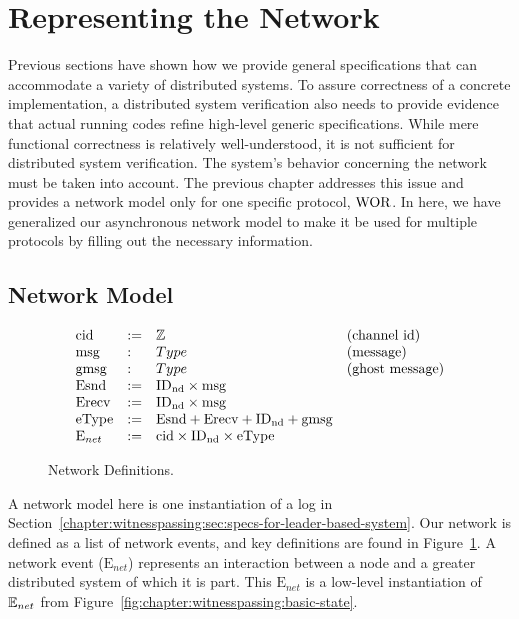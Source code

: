 \section{Representing the Network}
\label{chapter:witnesspassing:sec:low-level-implementation}


Previous sections have shown how we provide general specifications
that can accommodate a variety of distributed systems.  To assure correctness of a concrete implementation, a distributed system verification also needs to
provide evidence that actual running codes refine high-level generic
specifications. While mere functional correctness is relatively well-understood,
it is not sufficient for distributed system verification. The
system's behavior concerning the network must be taken into account. 
The previous chapter addresses this issue and provides a network model only for one specific protocol, $\mathrm{WOR}$. 
In here, we have generalized our asynchronous network model to make it be used for multiple protocols by filling out the necessary information. 




\subsection{Network Model}
\label{chapter:witnesspassing:subsec:network-model}

\begin{figure}
\begin{small}
\raggedright
$$
\begin{array}{llll}
\mathrm{cid} & := & \mathbb{Z} & \mbox{(channel id)} \\
\mathrm{msg} & : & Type & \mbox{(message)} \\
\mathrm{gmsg} & : & Type & \mbox{(ghost message)} \\
\mathrm{Esnd} & := & \mathrm{ID_{nd}} \times \mathrm{msg} \\
\mathrm{Erecv} & := & \mathrm{ID_{nd}} \times \mathrm{msg} \\
\mathrm{eType} & := & \mathrm{Esnd} + \mathrm{Erecv} + \mathrm{ID_{nd}} + \mathrm{gmsg} \\
\mathrm{E}_{net} & := & \mathrm{cid} \times \mathrm{ID_{nd}} \times \mathrm{eType} \\
\end{array}
$$
\end{small}
\caption{Network Definitions.}
\label{fig:chapter:witnesspassing:net-defs}
\end{figure}


A network model here is one instantiation of a log in
 Section~\ref{chapter:witnesspassing:sec:specs-for-leader-based-system}. Our network is defined as a list of
network events, and key definitions are found in Figure~\ref{fig:chapter:witnesspassing:net-defs}. A
network event ($\mathrm{E}_{net}$) represents an interaction between a node and
a greater distributed system of which it is part. This $\mathrm{E}_{net}$ is a
low-level instantiation of ${\mathbb{E}_{net}}$ from Figure~\ref{fig:chapter:witnesspassing:basic-state}.

